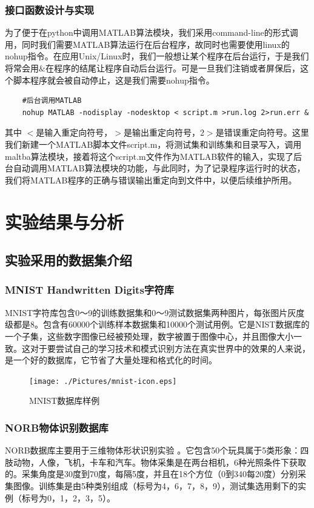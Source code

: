 \documentclass[oneside]{ZJUthesis}
\begin{document}
\subsection{接口函数设计与实现}
为了便于在python中调用MATLAB算法模块，我们采用command-line的形式调用，同时我们需要MATLAB算法运行在后台程序，故同时也需要使用linux的nohup指令。在应用Unix/Linux时，我们一般想让某个程序在后台运行，于是我们将常会用$\&$在程序的结尾让程序自动后台运行。可是一旦我们注销或者屏保后，这个脚本程序就会被自动停止，这是我们需要nohup指令。
\begin{verbatim}
    #后台调用MATLAB	             
    nohup MATLAB -nodisplay -nodesktop < script.m >run.log 2>run.err & 
\end{verbatim}

其中 $<$是输入重定向符号，$>$是输出重定向符号，$2>$是错误重定向符号。这里我们新建一个MATLAB脚本文件script.m，将测试集和训练集和目录写入，调用maltba算法模块，接着将这个script.m文件作为MATLAB软件的输入，实现了后台自动调用MATLAB算法模块的功能，与此同时，为了记录程序运行时的状态，我们将MATLAB程序的正确与错误输出重定向到文件中，以便后续维护所用。


\chapter{实验结果与分析}
\section{实验采用的数据集介绍}
\subsection{MNIST Handwritten Digits字符库}
MNIST字符库包含0～9的训练数据集和0～9测试数据集两种图片，每张图片灰度级都是8。包含有60000个训练样本数据集和10000个测试用例\cite{lecun1998gradient}。它是NIST数据库的一个子集，这些数字图像已经被预处理，数字被置于图像中心，并且图像大小一致。这对于要尝试自己的学习技术和模式识别方法在真实世界中的效果的人来说，是一个好的数据库，它节省了大量处理和格式化的时间。
\begin{figure}[h]
\centering
\texttt{[image: ./Pictures/mnist-icon.eps]}
\caption{MNIST数据库样例\label{fig:mnist-icon}}
\end{figure}



\subsection{NORB物体识别数据库}
NORB数据库主要用于三维物体形状识别实验 \cite{DBLP:conf/cvpr/LeCunHB04}。它包含50个玩具属于5类形象：四肢动物，人像，飞机，卡车和汽车。物体采集是在两台相机，6种光照条件下获取的。采集角度是30度到70度，每隔5度，并且在18个方位（0到340每20度）分别采集图像。训练集是由5种类别组成（标号为4，6，7，8，9），测试集选用剩下的实例（标号为0，1，2，3，5）。
\end{document}
